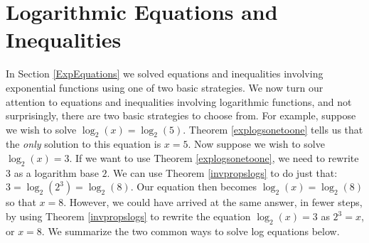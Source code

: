 \section{Logarithmic Equations and Inequalities}

\label{LogEquations}

In Section \ref{ExpEquations} we solved equations and inequalities involving exponential functions using one of two basic strategies.  We now turn our attention to equations and inequalities involving logarithmic functions, and not surprisingly, there are two basic strategies to choose from.  For example, suppose we wish  to solve $\log_{2}(x) = \log_{2}(5)$.  Theorem \ref{explogsonetoone} tells us that the \textit{only} solution to this equation is $x=5$.  Now suppose we wish to solve $\log_{2}(x) = 3$.  If we want to use Theorem \ref{explogsonetoone}, we need to rewrite $3$ as a logarithm base $2$.   We can use Theorem \ref{invpropslogs} to do just that: $3 = \log_{2}\left(2^{3}\right) = \log_{2}(8)$.  Our equation then becomes  $\log_{2}(x) =  \log_{2}(8)$ so that $x = 8$.  However, we could have arrived at the same answer,  in fewer steps, by using Theorem \ref{invpropslogs} to rewrite the equation $\log_{2}(x) = 3$ as $2^{3} = x$, or $x=8$.  We summarize the two common ways to solve log equations below.

\smallskip


\medskip

